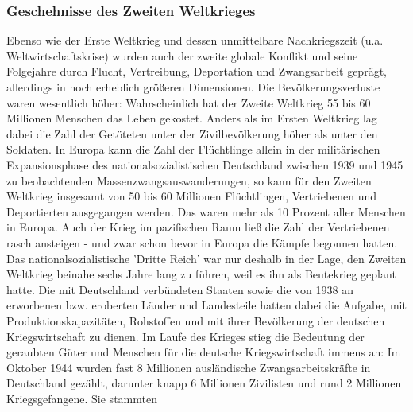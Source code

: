 \documentclass[letterpaper, 12pt]{article}
\let\tempsubsubsection\subsubsection
\renewcommand\subsubsection[1]{\vspace{0cm}\tempsubsubsection{#1}\vspace{0cm}}
\begin{document}
\subsubsection{Geschehnisse des Zweiten Weltkrieges}

Ebenso wie der Erste Weltkrieg und dessen unmittelbare Nachkriegszeit (u.a. Weltwirtschaftskrise) wurden auch der zweite globale Konflikt und seine Folgejahre durch Flucht, Vertreibung, Deportation und Zwangsarbeit geprägt, allerdings in noch erheblich größeren Dimensionen. Die Bevölkerungsverluste waren wesentlich höher: Wahrscheinlich hat der Zweite Weltkrieg 55 bis 60 Millionen Menschen das Leben gekostet. Anders als im Ersten Weltkrieg lag dabei die Zahl der Getöteten unter der Zivilbevölkerung höher als unter den Soldaten. In Europa kann die Zahl der Flüchtlinge allein in der militärischen Expansionsphase des nationalsozialistischen Deutschland zwischen 1939 und 1945 zu beobachtenden Massenzwangsauswanderungen, so kann für den Zweiten Weltkrieg insgesamt von 50 bis 60 Millionen Flüchtlingen, Vertriebenen und Deportierten ausgegangen werden. Das waren mehr als 10 Prozent aller Menschen in Europa. Auch der Krieg im pazifischen Raum ließ die Zahl der Vertriebenen rasch ansteigen - und zwar schon bevor in Europa die Kämpfe begonnen hatten. \\
Das nationalsozialistische 'Dritte Reich' war nur deshalb in der Lage, den Zweiten Weltkrieg beinahe sechs Jahre lang zu führen, weil es ihn als Beutekrieg geplant hatte. Die mit Deutschland verbündeten Staaten sowie die von 1938 an erworbenen bzw. eroberten Länder und Landesteile hatten dabei die Aufgabe, mit Produktionskapazitäten, Rohstoffen und mit ihrer Bevölkerung der deutschen Kriegswirtschaft zu dienen. Im Laufe des Krieges stieg die Bedeutung der geraubten Güter und Menschen für die deutsche Kriegswirtschaft immens an: Im Oktober 1944 wurden fast 8 Millionen ausländische Zwangsarbeitskräfte in Deutschland gezählt, darunter knapp 6 Millionen Zivilisten und rund 2 Millionen Kriegsgefangene. Sie stammten 

\clearpage


\end{document}

